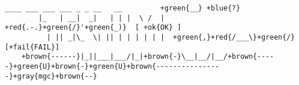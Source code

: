 \documentclass[]{article}
\begin{document}
\begin{Verbatim}[commandchars=+\{\}]
         ____ ___ ___ ___ _ _ __   __         +green{__} +blue{?}
        |_   | __|  _|   | | |  \ /  |    +red{.-.}+green{/}'+green{_)}  [ +ok{OK} ]
          | || _|\_  \| || | | | | | |  +green{,}+red{/___\}+green{/}    [+fail{FAIL}]
    +brown{------}|_||___|___/|_|+brown{-}\__|__/|__/+brown{-----}+green{U}+brown{-}+green{U}+brown{----------------}+gray{mgc}+brown{--}
\end{Verbatim}
\end{document}
